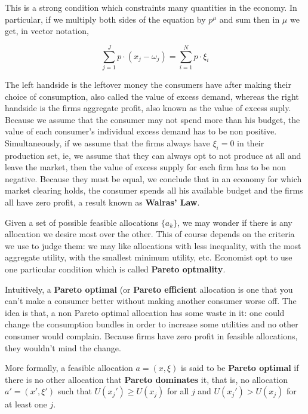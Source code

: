 This is a strong condition which constraints many quantities in
the economy. In particular, if we multiply both sides of the equation
by $p^\mu$ and sum then in $\mu$ we get, in vector notation,

\begin{equation}
  \label{eq:price_market_clearing}
  \sum_{j = 1}^J p \cdot (x_j - \omega_j) = \sum_{i=1}^N p\cdot \xi_i
\end{equation}

The left handside is the leftover money the consumers have after
making their choice of consumption, also called the value of excess
demand, whereas the right handside is the firms aggregate profit, also
known as the value of excess suply. Because we assume that the
consumer may not spend more than his budget, the value of each
consumer's individual excess demand has to be non
positive. Simultaneously, if we assume that the firms always have
$\xi_i = 0$ in their production set, ie, we assume that they can
always opt to not produce at all and leave the market, then the value
of excess supply for each firm has to be non negative. Because they
must be equal, we conclude that in an economy for which market
clearing holds, the consumer spends all his available budget and the
firms all have zero profit, a result known as \textbf{Walras' Law}.

Given a set of possible feasible allocations $\{a_k\}$, we may wonder
if there is any allocation we desire most over the other. This
of course depends on the criteria we use to judge them: we may like
allocations with less inequality, with the most aggregate utility,
with the smallest minimum utility, etc. Economist opt to use one
particular condition which is called \textbf{Pareto optmality}.

Intuitively, a \textbf{Pareto optimal} (or \textbf{Pareto efficient}
allocation is one that you can't make a consumer better without making
another consumer worse off. The idea is that, a non Pareto optimal
allocation has some waste in it: one could change the consumption
bundles in order to increase some utilities and no other consumer
would complain. Because firms have zero profit in feasible
allocations, they wouldn't mind the change. 

More formally, a feasible allocation $a = (x, \xi)$ is said to be
\textbf{Pareto optimal} if there is no other allocation that
\textbf{Pareto dominates} it, that is, no allocation $a' = (x', \xi')$
such that $U(x_j') \geq U(x_j)$ for all $j$ and $U(x_j') > U(x_j)$ for
at least one $j$.

